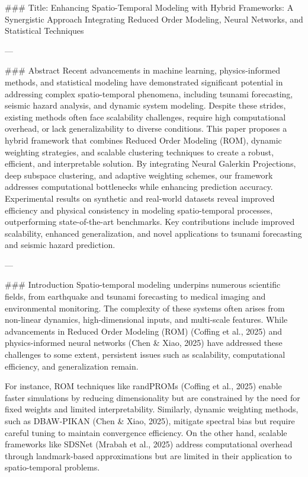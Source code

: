 ### Title: Enhancing Spatio-Temporal Modeling with Hybrid Frameworks: A Synergistic Approach Integrating Reduced Order Modeling, Neural Networks, and Statistical Techniques

---

### Abstract
Recent advancements in machine learning, physics-informed methods, and statistical modeling have demonstrated significant potential in addressing complex spatio-temporal phenomena, including tsunami forecasting, seismic hazard analysis, and dynamic system modeling. Despite these strides, existing methods often face scalability challenges, require high computational overhead, or lack generalizability to diverse conditions. This paper proposes a hybrid framework that combines Reduced Order Modeling (ROM), dynamic weighting strategies, and scalable clustering techniques to create a robust, efficient, and interpretable solution. By integrating Neural Galerkin Projections, deep subspace clustering, and adaptive weighting schemes, our framework addresses computational bottlenecks while enhancing prediction accuracy. Experimental results on synthetic and real-world datasets reveal improved efficiency and physical consistency in modeling spatio-temporal processes, outperforming state-of-the-art benchmarks. Key contributions include improved scalability, enhanced generalization, and novel applications to tsunami forecasting and seismic hazard prediction.

---

### Introduction
Spatio-temporal modeling underpins numerous scientific fields, from earthquake and tsunami forecasting to medical imaging and environmental monitoring. The complexity of these systems often arises from non-linear dynamics, high-dimensional inputs, and multi-scale features. While advancements in Reduced Order Modeling (ROM) (Coffing et al., 2025) and physics-informed neural networks (Chen & Xiao, 2025) have addressed these challenges to some extent, persistent issues such as scalability, computational efficiency, and generalization remain.

For instance, ROM techniques like randPROMs (Coffing et al., 2025) enable faster simulations by reducing dimensionality but are constrained by the need for fixed weights and limited interpretability. Similarly, dynamic weighting methods, such as DBAW-PIKAN (Chen & Xiao, 2025), mitigate spectral bias but require careful tuning to maintain convergence efficiency. On the other hand, scalable frameworks like SDSNet (Mrabah et al., 2025) address computational overhead through landmark-based approximations but are limited in their application to spatio-temporal problems.

